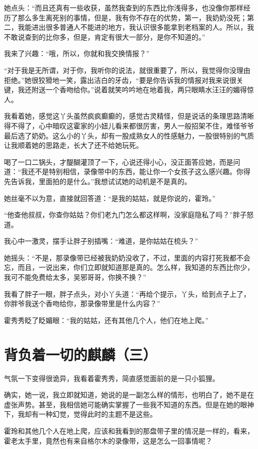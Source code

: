 她点头：“而且还真有一些收获，虽然我查到的东西比你浅得多，也没像你那样经历了那么多生离死别的事情，但是，我有你不存在的优势，第一，我奶奶没死；第二，我能进出很多普通人不能进的地方，我认识很多能拿到老档案的人。所以，我不敢说查到的比你多，但是，肯定有很大一部分，是你不知道的。”

我来了兴趣：“哦，所以，你就和我交换情报？”

“对于我是无所谓，对于你，我听你的说法，就很重要了，所以，我觉得你没理由拒绝。”她很狡猾地一笑，露出洁白的牙齿，“要是你告诉我的情报对我来说很关键，我还附送一个香吻给你。”说着就笑吟吟地在地着我，两只眼睛水汪汪的媚得惊人。

我看着她，感觉这丫头虽然疯疯癫癫的，感觉古灵精怪，但是说话的条理思路清晰得不得了，心中暗叹这霍家的小妞儿看来都很厉害，男人一般招架不住，难怪爷爷最后选了奶奶。这么小的丫头，却有一股成熟女人的性感魅力，一股很特别的气质让我顺着她的思路走，长大了还不给她玩死。

喝了一口二锅头，才醍醐灌顶了一下，心说还得小心，没正面答应她，而是问道：“我还不是特别相信，录像带中的东西，能让你一个女孩子这么感兴趣。你得先告诉我，里面拍的是什么。”我想试试她的动机是不是真的。

她丝毫不以为意，直接就回答道：“是我的姑姑，就是你说的，霍玲。”

“他查他叔叔，你查你姑姑？你们老九门怎么都这样啊，没家庭隐私了吗？”胖子怒道。

我心中一激灵，摆手让胖子别插嘴：“难道，是你姑姑在梳头？”

她摇头：“不是，那录像带已经被我奶奶没收了，不过，里面的内容打死我都不会忘，而且，一说出来，你们立即就知道那是真的。怎么样，我知道的东西比你少，我可不能免费给太多，吴邪哥哥，你换不换？”

我看了胖子一眼，胖子点头，对小丫头道：“再给个提示，丫头，给到点子上了，你胖爷我送个香吻给你，那录像带里是什么内容？”

霍秀秀眨了眨媚眼：“我的姑姑，还有其他几个人，他们在地上爬。”

\chapter{背负着一切的麒麟（三）}

气氛一下变得很诡异，我看着霍秀秀，简直感觉面前的是一只小狐狸。

确实，她一说，我立即就知道，她说的是一副怎么样的情形，也明白了，她不是在虚张声势。甚至，我相信她可能确实掌握了一些我不知道的东西。但是在她的眼神下，我却有一种幻觉，觉得此时的主题不是这些。

霍玲和其他几个人在地上爬，应该和我看到的那盘带子里的情况是一样的，看来，霍老太手里，竟然也有来自格尔木的录像带，这是怎么一回事情呢？

